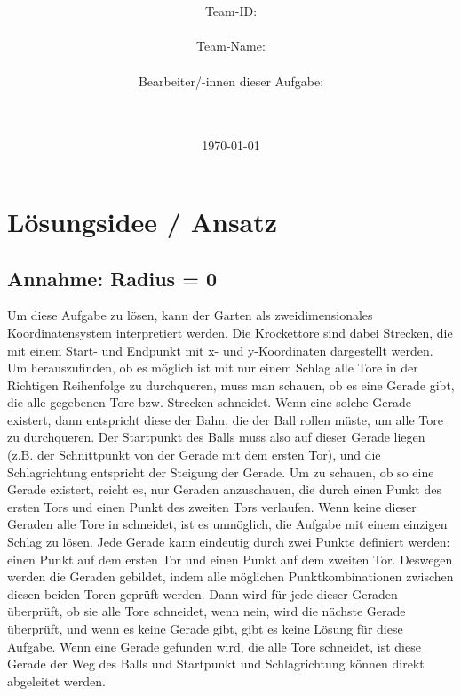 \documentclass[a4paper,10pt,ngerman]{scrartcl}
\title{\textbf{\Huge\Aufgabe}}
\author{\LARGE Team-ID: \LARGE \TeamId \\\\
	    \LARGE Team-Name: \LARGE \TeamName \\\\
	    \LARGE Bearbeiter/-innen dieser Aufgabe: \\ 
	    \LARGE \Namen\\\\}
\date{\LARGE\today}
\begin{document}
\maketitle
\tableofcontents

\vspace{0.5cm}

\section{Lösungsidee / Ansatz}
\subsection{Annahme: Radius = 0}
Um diese Aufgabe zu lösen, kann der Garten als zweidimensionales Koordinatensystem interpretiert werden. Die Krockettore sind dabei Strecken, die mit einem Start- und Endpunkt mit x- und y-Koordinaten dargestellt werden.
Um herauszufinden, ob es möglich ist mit nur einem Schlag alle Tore in der Richtigen Reihenfolge zu durchqueren, muss man schauen, ob es eine Gerade gibt, die alle gegebenen Tore bzw. Strecken schneidet.
Wenn eine solche Gerade existert, dann entspricht diese der Bahn, die der Ball rollen müste, um alle Tore zu durchqueren. Der Startpunkt des Balls muss also auf dieser Gerade liegen (z.B. der Schnittpunkt von der Gerade mit dem ersten Tor), und die Schlagrichtung entspricht 
der Steigung der Gerade. 
\newline
Um zu schauen, ob so eine Gerade existert, reicht es, nur Geraden anzuschauen, die durch einen Punkt des ersten Tors und einen Punkt des zweiten Tors verlaufen. Wenn keine dieser Geraden alle Tore in schneidet, ist es unmöglich, die Aufgabe mit einem einzigen Schlag zu lösen.
Jede Gerade kann eindeutig durch zwei Punkte definiert werden: einen Punkt auf dem ersten Tor und einen Punkt auf dem zweiten Tor. Deswegen werden die Geraden gebildet, indem alle möglichen Punktkombinationen zwischen diesen beiden Toren geprüft werden.
\newline
Dann wird für jede dieser Geraden überprüft, ob sie alle Tore schneidet, wenn nein, wird die nächste Gerade überprüft, und wenn es keine Gerade gibt, gibt es keine Lösung für diese Aufgabe. Wenn eine Gerade gefunden wird, die alle Tore schneidet,
ist diese Gerade der Weg des Balls und Startpunkt und Schlagrichtung können direkt abgeleitet werden.
\end{document}
